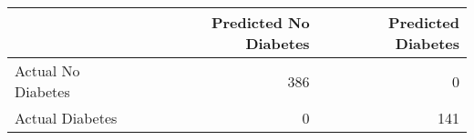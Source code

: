 \begin{tabular}{lrr}
\toprule
 & Predicted No Diabetes & Predicted Diabetes \\
\midrule
Actual No Diabetes & 386 & 0 \\
Actual Diabetes & 0 & 141 \\
\bottomrule
\end{tabular}
